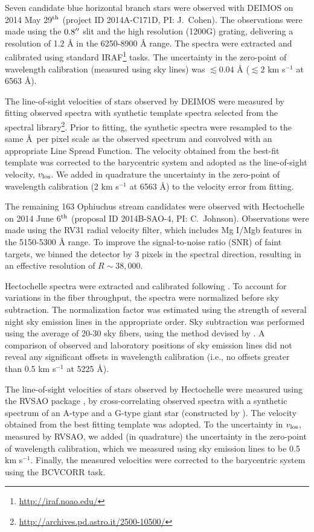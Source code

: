 \documentclass[iop]{emulateapj}
\begin{document}
Seven candidate blue horizontal branch stars were observed with DEIMOS on 2014
May 29$^{\rm th}$ (project ID 2014A-C171D, PI: J.~Cohen). The observations were
made using the $0.8\mbox{$^{\prime\prime}$}$ slit and the high resolution (1200G) grating,
delivering a resolution of 1.2 {\AA} in the 6250-8900 {\AA} range. The spectra
were extracted and calibrated using standard
IRAF\footnote{\url{http://iraf.noao.edu/}} tasks. The uncertainty in the
zero-point of wavelength calibration (measured using sky lines) was
$\lesssim0.04$ {\AA} ($\lesssim2$ km s$^{-1}$ at 6563 \AA).

The line-of-sight velocities of stars observed by DEIMOS were measured by
fitting observed spectra with synthetic template spectra selected from the
\citet{mun05} spectral
library\footnote{\url{http://archives.pd.astro.it/2500-10500/}}. Prior to
fitting, the synthetic spectra were resampled to the same \AA~per pixel scale
as the observed spectrum and convolved with an appropriate Line Spread Function.
The velocity obtained from the best-fit template was corrected to the
barycentric system and adopted as the line-of-sight velocity, $v_{\rm los}$. We
added in quadrature the uncertainty in the zero-point of wavelength calibration
(2 km s$^{-1}$ at 6563 \AA) to the velocity error from fitting.

The remaining 163 Ophiuchus stream candidates were observed with Hectochelle on
2014 June 6$^{\rm th}$ (proposal ID 2014B-SAO-4, PI: C.~Johnson). Observations
were made using the RV31 radial velocity filter, which includes Mg I/Mgb
features in the 5150-5300 {\AA} range. To improve the signal-to-noise ratio
(SNR) of faint targets, we binned the detector by 3 pixels in the spectral
direction, resulting in an effective resolution of $R\sim38,000$.

Hectochelle spectra were extracted and calibrated following \citet{cal09}. To
account for variations in the fiber throughput, the spectra were normalized
before sky subtraction. The normalization factor was estimated using the
strength of several night sky emission lines in the appropriate order. Sky
subtraction was performed using the average of 20-30 sky fibers, using the
method devised by \citet{kop11}. A comparison of observed and laboratory
positions of sky emission lines did not reveal any significant offsets in
wavelength calibration (i.e., no offsets greater than 0.5 km s$^{-1}$ at 5225
\AA).

The line-of-sight velocities of stars observed by Hectochelle were measured
using the RVSAO package \citep{km98}, by cross-correlating observed spectra with
a synthetic spectrum of an A-type and a G-type giant star (constructed by
\citealt{lat02}). The velocity obtained from the best fitting template was
adopted. To the uncertainty in $v_{\rm los}$, measured by RVSAO, we added (in
quadrature) the uncertainty in the zero-point of wavelength calibration, which
we measured using sky emission lines to be 0.5 km s$^{-1}$. Finally, the
measured velocities were corrected to the barycentric system using the BCVCORR
task.
\end{document}
